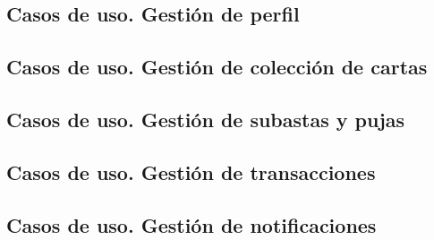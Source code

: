 \newpage
\subsection{Casos de uso. Gestión de perfil}


\newpage
\subsection{Casos de uso. Gestión de colección de cartas}


\newpage
\subsection{Casos de uso. Gestión de subastas y pujas}


\newpage
\subsection{Casos de uso. Gestión de transacciones}


\newpage
\subsection{Casos de uso. Gestión de notificaciones}
